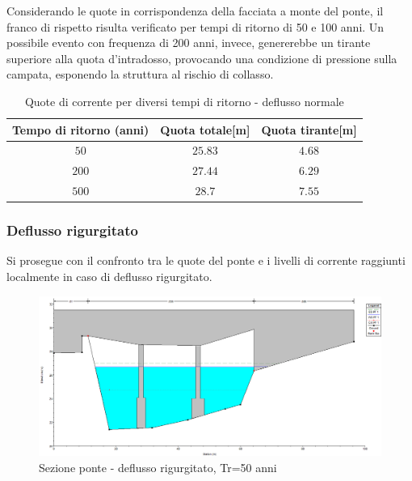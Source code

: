 \documentclass[12pt]{article} %
\begin{document}
\noindent Considerando le quote in corrispondenza della facciata a monte del ponte, il franco di rispetto risulta verificato per tempi di ritorno di 50 e 100 anni.
Un possibile evento con frequenza di 200 anni, invece, genererebbe un tirante superiore alla quota d'intradosso, provocando una condizione di pressione sulla campata, esponendo la struttura al rischio di collasso.

\begin{table}[H]
    \centering
    \begin{tabular}{ccc}
        \hline
        \textbf{Tempo di ritorno (anni)} & \textbf{Quota totale[m]}&\textbf{Quota tirante[m]} \\
        \hline
        $50$ & $25.83$ & $4.68$\\
        $200$ & $27.44$ & $6.29$\\
        $500$ & $28.7$ & $7.55$\\
        \hline
    \end{tabular}
    \caption{Quote di corrente per diversi tempi di ritorno - deflusso normale}
\end{table}

\newpage

\subsubsection{Deflusso rigurgitato}

\noindent Si prosegue con il confronto tra le quote del ponte e i livelli di corrente raggiunti localmente in caso di deflusso rigurgitato.

\begin{figure}[H]
    \centering
    \includegraphics[scale=0.5]{PonteUP56.PNG}
    \caption{Sezione ponte - deflusso rigurgitato, Tr=50 anni}
\end{figure}
\end{document}
